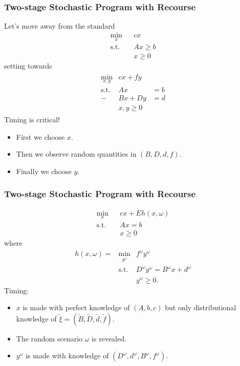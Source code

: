 \documentclass[12pt,handout]{beamer}
\begin{document}
\begin{frame}
\frametitle{Two-stage Stochastic Program with Recourse}
Let's move away from the standard
\begin{eqnarray}
\min_{x} && c x \nonumber \\
\mbox{s.t.} && A x \ge b \nonumber \\
&& x \ge 0 \nonumber
\end{eqnarray}
setting towards
\begin{eqnarray}
\begin{aligned}
\min_{x,y} & c x + f y & \nonumber \\
\mbox{s.t.} & A x & = b \nonumber \\
- & B x + D y &= d \nonumber \\
& x,y \ge 0 & \nonumber
\end{aligned}
\end{eqnarray}
Timing is critical!
\begin{itemize}
\item First we choose $x$.
\item Then we observe random quantities in $(B, D, d, f)$.
\item Finally we choose $y$.
\end{itemize}
\end{frame}

\begin{frame}
\frametitle{Two-stage Stochastic Program with Recourse}
\begin{eqnarray}
\min_x && c x + E h(x, \omega) \nonumber \\
\mbox{s.t.} && Ax = b \nonumber \\
&& x \ge 0 \nonumber
\end{eqnarray}
where
\begin{eqnarray}
h(x, \omega) = & \min_{y^\omega} & f^\omega y^\omega \nonumber \\
& \mbox{s.t.} & D^\omega y^\omega = B^\omega x + d^\omega \nonumber \\
&& y^\omega \ge 0. \nonumber
\end{eqnarray}
Timing:
\begin{itemize}
\item $x$ is made with perfect knowledge of $(A, b, c)$ but only distributional knowledge of $\tilde{\xi} = (\tilde{B}, \tilde{D}, \tilde{d}, \tilde{f})$.
\item The random scenario $\omega$ is revealed.
\item $y^\omega$ is made with knowledge of $(D^\omega, d^\omega, B^\omega, f^\omega).$
\end{itemize}
\end{frame}
\end{document}
